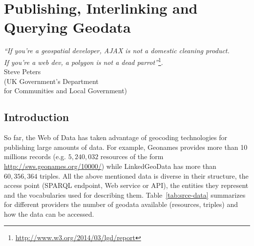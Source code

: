 
\chapter{Publishing, Interlinking and Querying Geodata}
\label{ch:ch2}

\begin{flushright}
\textit{``If you're a geospatial developer, AJAX is not a domestic cleaning product. \\
If you're a web dev, a polygon is not a dead parrot''}\footnote{\url{http://www.w3.org/2014/03/lgd/report}}.\\
Steve Peters \\
(UK Government's Department \\for Communities and Local Government)

\end{flushright}

\section{Introduction}
\label{sec:intro-ch2}
So far, the Web of Data has taken advantage of geocoding technologies for publishing large amounts of data. For example, Geonames provides more than 10 millions records (e.g. $5,240,032$ resources of the form \url{http://sws.geonames.org/10000/}) while LinkedGeoData has more than $60,356,364$ triples. All the above mentioned data is diverse in their structure, the access point (SPARQL endpoint, Web service or API), the entities they represent and the vocabularies used for describing them. Table~\ref{tab:srce-data} summarizes for different providers the number of geodata available (resources, triples) and how the data can be accessed.

